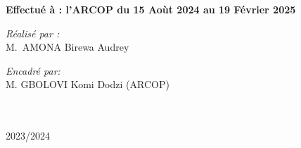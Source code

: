 \begin{titlepage}
\begin{center}
		{\large \bfseries Effectué à : l'\ac{ARCOP} du  15 Aoùt 2024 au 19 Février 2025 }\\[1cm]
		\noindent
		\begin{minipage}{0.4\textwidth}
			\begin{flushleft} \large
				\emph{\color{orange!80!black}Réalisé par :}\\
				M.~\textsc{AMONA} Birewa Audrey \\
			\end{flushleft}
		\end{minipage}%
		\begin{minipage}{0.5\textwidth}
			\begin{flushright} \large
				\emph{\color{orange!80!black}Encadré par:} \\
				
				M. \textsc{GBOLOVI} Komi Dodzi (\ac{ARCOP})\\
			\end{flushright}
		\end{minipage}\\[1cm]

	


		{\large \color{orange!80!black}{Année universitaire}\\ \color{blue!80!black}2023/2024}

	\end{center}
\end{titlepage}
